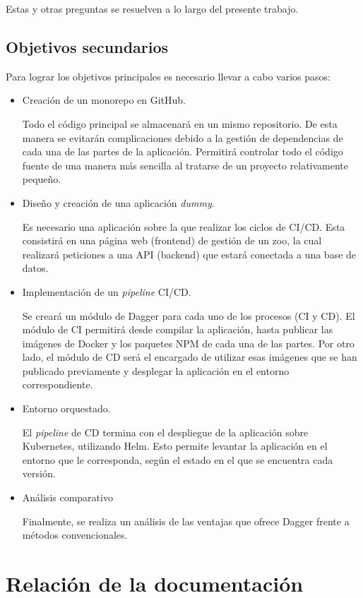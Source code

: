 Estas y otras preguntas se resuelven a lo largo del presente trabajo.

\subsection*{Objetivos secundarios}

Para lograr los objetivos principales es necesario llevar a cabo varios pasos:
\begin{itemize}
  \item Creación de un monorepo\cite{monorepo} en GitHub.

    Todo el código principal se almacenará en un mismo repositorio. De esta manera se evitarán complicaciones debido a la gestión de dependencias de cada una de las partes de la aplicación. Permitirá controlar todo el código fuente de una manera más sencilla al tratarse de un proyecto relativamente pequeño.
  \item Diseño y creación de una aplicación \textit{dummy}.

    Es necesario una aplicación sobre la que realizar los ciclos de CI/CD. Esta consistirá en una página web (frontend) de gestión de un zoo, la cual realizará peticiones a una API (backend) que estará conectada a una base de datos.
  \item Implementación de un \textit{pipeline} CI/CD.

    Se creará un módulo de Dagger para cada uno de los procesos (CI y CD). El módulo de CI permitirá desde compilar la aplicación, hasta publicar las imágenes de Docker y los paquetes NPM de cada una de las partes. Por otro lado, el módulo de CD será el encargado de utilizar esas imágenes que se han publicado previamente y desplegar la aplicación en el entorno correspondiente.
  \item Entorno orquestado.

    El \textit{pipeline} de CD termina con el despliegue de la aplicación sobre Kubernetes\cite{kubernetes}, utilizando Helm\cite{helm}. Esto permite levantar la aplicación en el entorno que le corresponda, según el estado en el que se encuentra cada versión.

  \item Análisis comparativo

    Finalmente, se realiza un análisis de las ventajas que ofrece Dagger frente a métodos convencionales.
\end{itemize}

\section{Relación de la documentación}

